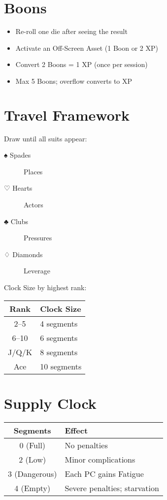 \section{Boons}

\begin{itemize}
  \item Re-roll one die after seeing the result
  \item Activate an Off-Screen Asset (1 Boon or 2 XP)
  \item Convert 2 Boons = 1 XP (once per session)
  \item Max 5 Boons; overflow converts to XP
\end{itemize}

\section{Travel Framework}

Draw until all suits appear:
\begin{description}
  \item[♠ Spades] Places
  \item[♡ Hearts] Actors
  \item[♣ Clubs] Pressures
  \item[♢ Diamonds] Leverage
\end{description}

Clock Size by highest rank:
\begin{center}
\begin{tabular}{cl}
\toprule
\textbf{Rank} & \textbf{Clock Size} \\
\midrule
2–5 & 4 segments \\
6–10 & 6 segments \\
J/Q/K & 8 segments \\
Ace & 10 segments \\
\bottomrule
\end{tabular}
\end{center}

\section{Supply Clock}

\begin{center}
\begin{tabular}{cl}
\toprule
\textbf{Segments} & \textbf{Effect} \\
\midrule
0 (Full) & No penalties \\
2 (Low) & Minor complications \\
3 (Dangerous) & Each PC gains Fatigue \\
4 (Empty) & Severe penalties; starvation \\
\bottomrule
\end{tabular}
\end{center}

